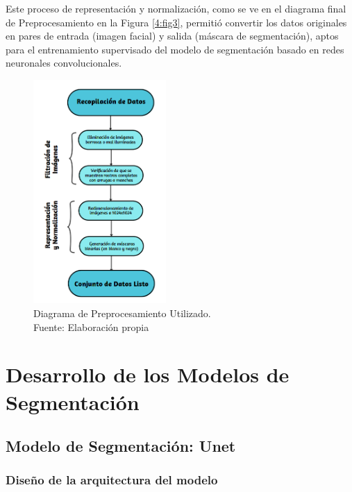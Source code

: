 Este proceso de representación y normalización, como se ve en el diagrama final de Preprocesamiento en la Figura \ref{4:fig3}, permitió convertir los datos originales en pares de entrada (imagen facial) y salida (máscara de segmentación), aptos para el entrenamiento supervisado del modelo de segmentación basado en redes neuronales convolucionales.

\begin{figure}[h]
	\begin{center}
		\includegraphics[width=0.45\textwidth]{4/figures/diagrama final prepo.png}
		\caption[Diagrama de Preprocesamiento Utilizado]{Diagrama de Preprocesamiento Utilizado.\\
		Fuente: Elaboración propia}
		\label{4:fig2}
	\end{center}
\end{figure}

\section{Desarrollo de los Modelos de Segmentación}

\subsection{Modelo de Segmentación: Unet}

\subsubsection{Diseño de la arquitectura del modelo}


